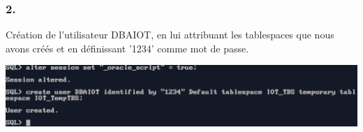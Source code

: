 \subsubsection*{2.}

Création de l'utilisateur DBAIOT, en lui attribuant les tablespaces que nous avons créés et en définissant '1234' comme mot de passe.



\begin{center}
    \includegraphics[width=\textwidth]{ScreenShot/Partie1/dbaiot.png}
\end{center}

